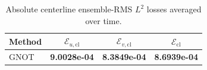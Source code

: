 \begin{table}[t]
\centering
\caption{Absolute centerline ensemble-RMS $L^2$ losses averaged over time.}
\label{tab:centerline_abs_ensemble_rms_l2_loss}
\begin{tabular}{lccc}
\toprule
Method & $\mathcal{E}_{u,\mathrm{cl}}$ & $\mathcal{E}_{v,\mathrm{cl}}$ & $\mathcal{E}_{\mathrm{cl}}$ \\
\midrule
GNOT & \textbf{9.0028e-04} & \textbf{8.3849e-04} & \textbf{8.6939e-04} \\
\bottomrule
\end{tabular}
\end{table}